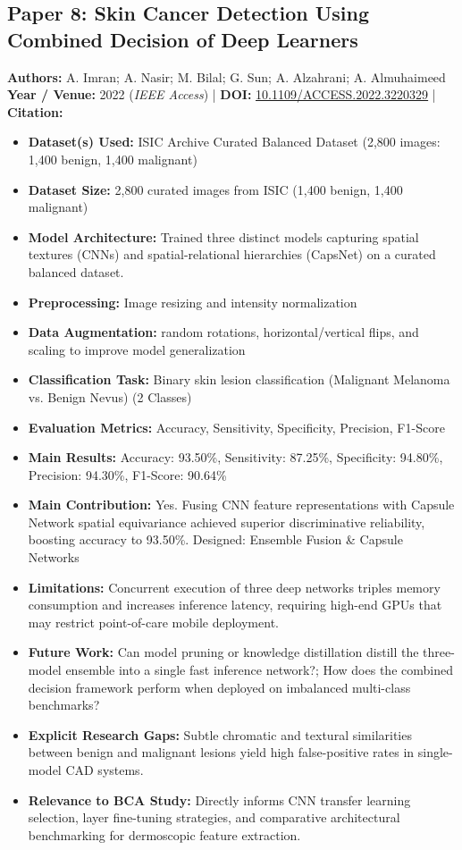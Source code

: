 \documentclass[11pt,a4paper]{article}
\begin{document}
\subsection{Paper 8: Skin Cancer Detection Using Combined Decision of Deep Learners}
\textbf{Authors:} A. Imran; A. Nasir; M. Bilal; G. Sun; A. Alzahrani; A. Almuhaimeed \\
\textbf{Year / Venue:} 2022 (\textit{IEEE Access}) | \textbf{DOI:} \href{https://doi.org/10.1109/ACCESS.2022.3220329}{10.1109/ACCESS.2022.3220329} | \textbf{Citation:} \cite{9940917}

\begin{itemize}\small
\item \textbf{Dataset(s) Used:} ISIC Archive Curated Balanced Dataset (2,800 images: 1,400 benign, 1,400 malignant)
\item \textbf{Dataset Size:} 2,800 curated images from ISIC (1,400 benign, 1,400 malignant)
\item \textbf{Model Architecture:} Trained three distinct models capturing spatial textures (CNNs) and spatial-relational hierarchies (CapsNet) on a curated balanced dataset.
\item \textbf{Preprocessing:} Image resizing and intensity normalization
\item \textbf{Data Augmentation:} random rotations, horizontal/vertical flips, and scaling to improve model generalization
\item \textbf{Classification Task:} Binary skin lesion classification (Malignant Melanoma vs. Benign Nevus) (2 Classes)
\item \textbf{Evaluation Metrics:} Accuracy, Sensitivity, Specificity, Precision, F1-Score
\item \textbf{Main Results:} Accuracy: 93.50\%, Sensitivity: 87.25\%, Specificity: 94.80\%, Precision: 94.30\%, F1-Score: 90.64\%
\item \textbf{Main Contribution:} Yes. Fusing CNN feature representations with Capsule Network spatial equivariance achieved superior discriminative reliability, boosting accuracy to 93.50\%. Designed: Ensemble Fusion \& Capsule Networks
\item \textbf{Limitations:} Concurrent execution of three deep networks triples memory consumption and increases inference latency, requiring high-end GPUs that may restrict point-of-care mobile deployment.
\item \textbf{Future Work:} Can model pruning or knowledge distillation distill the three-model ensemble into a single fast inference network?; How does the combined decision framework perform when deployed on imbalanced multi-class benchmarks?
\item \textbf{Explicit Research Gaps:} Subtle chromatic and textural similarities between benign and malignant lesions yield high false-positive rates in single-model CAD systems.
\item \textbf{Relevance to BCA Study:} Directly informs CNN transfer learning selection, layer fine-tuning strategies, and comparative architectural benchmarking for dermoscopic feature extraction.
\end{itemize}
\end{document}
